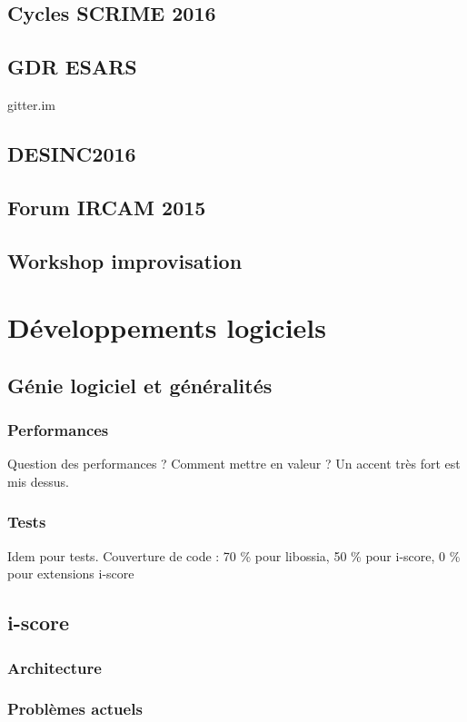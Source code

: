 \documentclass[french,a4paper]{book}
\begin{document}
\subsection{Cycles SCRIME 2016}
\subsection{GDR ESARS}gitter.im
\subsection{DESINC2016}
\subsection{Forum IRCAM 2015}
\subsection{Workshop improvisation}

\section{Développements logiciels}

\subsection{Génie logiciel et généralités}
\subsubsection{Performances}
Question des performances ? Comment mettre en valeur ? 
Un accent très fort est mis dessus.

\subsubsection{Tests}
Idem pour tests.
Couverture de code : 70 \% pour libossia, 50 \% pour i-score, 0 \% pour extensions i-score

\subsection{i-score}
\subsubsection{Architecture}
\subsubsection{Problèmes actuels}
\end{document}

